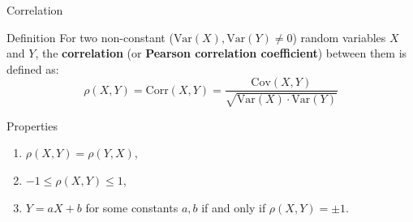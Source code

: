\documentclass{beamer}
\begin{document}
	\begin{frame}{Correlation}
		
		\begin{block}{Definition}
			For two non-constant ($\text{Var}(X), \text{Var}(Y) \ne 0$) random variables \( X \) and \( Y \), the \textbf{correlation} (or \textbf{Pearson correlation coefficient}) between them is defined as:
			\[ \rho(X,Y)=\text{Corr}(X, Y) = \frac{\text{Cov}(X, Y)}{\sqrt{\text{Var}(X) \cdot \text{Var}(Y)}} \]
			
		\end{block}
		\pause
		\begin{block}{Properties}
			\begin{enumerate}
				\item \( \rho(X, Y) = \rho(Y, X) \),
				\item \( -1 \le \rho(X, Y) \leq 1 \),
				\item \( Y = aX + b \) for some constants \( a, b \) if and only if \( \rho(X, Y) = \pm 1 \).
			\end{enumerate}
		\end{block}
		
	\end{frame}
	
\end{document}
